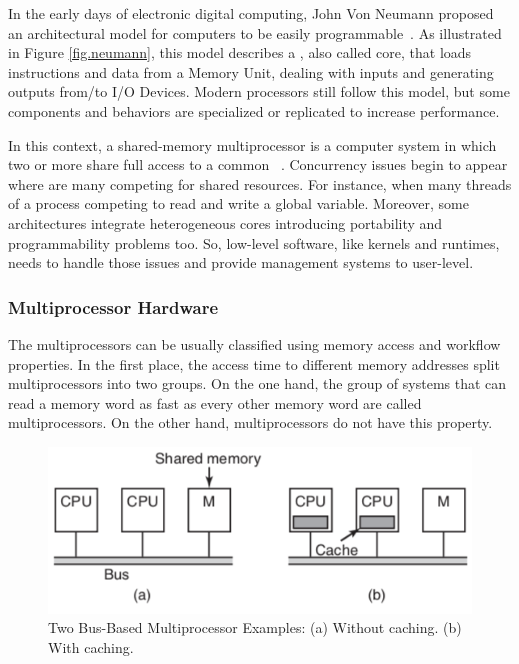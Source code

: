 		In the early days of electronic digital computing, John Von Neumann
		proposed an architectural model for computers to be easily programmable~\cite{von-neumann:model}.
		As illustrated in Figure \ref{fig.neumann}, this model describes a \cpu,
		also called core, that loads instructions and data from a Memory Unit,
		dealing with inputs and generating outputs from/to I/O Devices.
		Modern processors still follow this model, but some components and
		behaviors are specialized or replicated to increase performance.

		In this context, a shared-memory multiprocessor is a computer system
		in which two or more \cpus share full access to a common \ram~\cite{tanenbaum:4ed}.
		Concurrency issues begin to appear where are many \cpus competing for
		shared resources.
		For instance, when many threads of a process competing to read and write a global variable.
		Moreover, some architectures integrate heterogeneous cores introducing portability
		and programmability problems too.
		So, low-level software, like \os kernels and runtimes, needs to handle those
		issues and provide management systems to user-level.

		\subsubsection{Multiprocessor Hardware}
		\label{sec.multiprocessor-hw}

			The multiprocessors can be usually classified using memory access
			and workflow properties.
			In the first place, the access time to different memory addresses
			split multiprocessors into two groups.
			On the one hand, the group of systems that can read a memory word
			as fast as every other memory word are called \uma multiprocessors.
			On the other hand, \numa multiprocessors do not have this property.

			\begin{figure}[h]
				\centering
				\includegraphics[width=.9\textwidth]{images/uma.png}

				\caption{
					Two Bus-Based \uma Multiprocessor Examples: (a) Without caching. (b) With caching.
				}\par
				\label{fig.uma}
			\end{figure}

